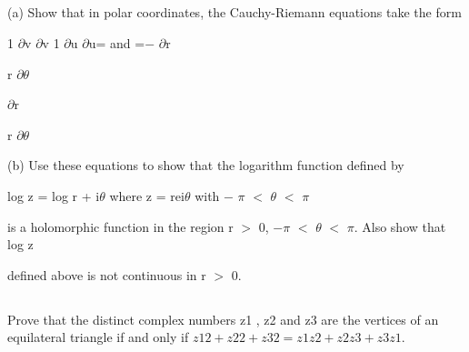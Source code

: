 \subsection{}

(a) Show that in polar coordinates, the Cauchy-Riemann equations take the form

1 $\partial$v $\partial$v 1 $\partial$u $\partial$u= and
=$-$
$\partial$r

r $\partial$$\theta$

$\partial$r

r $\partial$$\theta$

(b) Use these equations to show that the logarithm function defined by

log z = log r + i$\theta$ where z = rei$\theta$ with $-$ $\pi$ $<$ $\theta$ $<$ $\pi$

is a holomorphic function in the region r $>$ 0, $-$$\pi$ $<$ $\theta$ $<$ $\pi$. Also show that log z

defined above is not continuous in r $>$ 0.

\subsection{}
Prove that the distinct complex numbers z1 , z2 and z3 are the vertices of an equilateral triangle if and only if
$z12 + z22 + z32 = z1 z2 + z2 z3 + z3 z1$.
